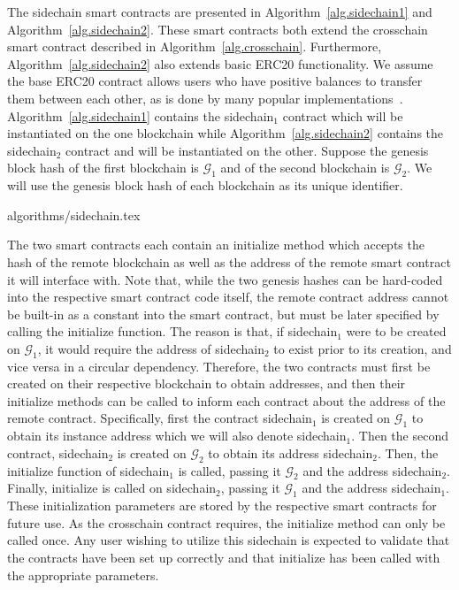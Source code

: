 The sidechain smart contracts are presented in Algorithm~\ref{alg.sidechain1}
and Algorithm~\ref{alg.sidechain2}. These smart contracts both extend the
\textsf{crosschain} smart contract described in Algorithm~\ref{alg.crosschain}.
Furthermore, Algorithm~\ref{alg.sidechain2} also extends basic ERC20
functionality. We assume the base ERC20 contract allows users who have positive
balances to transfer them between each other, as is done by many popular
implementations~\cite{openzeppelin}. Algorithm~\ref{alg.sidechain1} contains the
\textsf{sidechain}$_1$ contract which will be instantiated on the one blockchain
while Algorithm~\ref{alg.sidechain2} contains the \textsf{sidechain}$_2$
contract and will be instantiated on the other. Suppose the genesis block hash
of the first blockchain is $\mathcal{G}_1$ and of the second blockchain is
$\mathcal{G}_2$. We will use the genesis block hash of each blockchain as its
unique identifier.

{algorithms/sidechain.tex}

The two smart contracts each contain an \textsf{initialize} method which accepts
the hash of the remote blockchain as well as the address of the remote smart
contract it will interface with. Note that, while the two genesis hashes can be
hard-coded into the respective smart contract code itself, the remote contract
address cannot be built-in as a constant into the smart contract, but must be
later specified by calling the \textsf{initialize} function. The reason is that,
if \textsf{sidechain}$_1$ were to be created on $\mathcal{G}_1$, it would
require the address of \textsf{sidechain}$_2$ to exist prior to its creation,
and vice versa in a circular dependency. Therefore, the two contracts must first
be created on their respective blockchain to obtain addresses, and then their
\textsf{initialize} methods can be called to inform each contract about the
address of the remote contract. Specifically, first the contract
\textsf{sidechain}$_1$ is created on $\mathcal{G}_1$ to obtain its instance
address which we will also denote \textsf{sidechain}$_1$. Then the second
contract, \textsf{sidechain}$_2$ is created on $\mathcal{G}_2$ to obtain its
address \textsf{sidechain}$_2$. Then, the \textsf{initialize} function of
\textsf{sidechain}$_1$ is called, passing it $\mathcal{G}_2$ and the address
\textsf{sidechain}$_2$. Finally, \textsf{initialize} is called on
\textsf{sidechain}$_2$, passing it $\mathcal{G}_1$ and the address
\textsf{sidechain}$_1$. These initialization parameters are stored by the
respective smart contracts for future use. As the \textsf{crosschain} contract
requires, the \textsf{initialize} method can only be called once. Any user
wishing to utilize this sidechain is expected to validate that the contracts
have been set up correctly and that \textsf{initialize} has been called with the
appropriate parameters.

